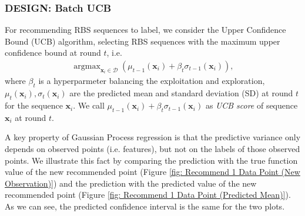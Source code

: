     

\subsubsection{DESIGN: Batch UCB}

For recommending RBS sequences to label, we consider the Upper Confidence Bound (UCB) algorithm, 
selecting RBS sequences with the maximum upper confidence bound at round $t$, i.e.
\begin{align}
\label{Eq: GPUCB}
    \operatorname{argmax}_{\mathbf{x}_i \in \mathcal{D}} \left( \mu_{t-1}(\mathbf{x}_i) + \beta_t \sigma_{t-1}(\mathbf{x}_i)\right),
\end{align}
where $\beta_t$ is a hyperparmeter balancing the exploitation and exploration, 
$\mu_t(\mathbf{x}_i), \sigma_t(\mathbf{x}_i)$ are the predicted mean and standard deviation (SD) at round $t$ for the sequence $\mathbf{x}_i$.
We call $\mu_{t-1}(\mathbf{x}_i) + \beta_t \sigma_{t-1}(\mathbf{x}_i)$ as \textit{UCB score} of sequence $\mathbf{x}_i$ at round $t$.

A key property of Gaussian Process regression is that the predictive variance only depends on observed points (i.e. features), but not on the labels of those observed points. 
We illustrate this fact by comparing the prediction with the true function value of the new recommended point (Figure \ref{fig: Recommend 1 Data Point (New Observation)}) and the prediction with the predicted value of the new recommended point (Figure \ref{fig: Recommend 1 Data Point (Predicted Mean)}).
As we can see, the predicted confidence interval is the same for the two plots. 

